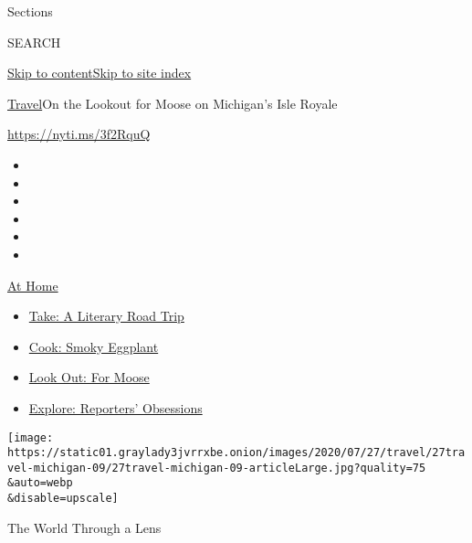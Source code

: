 Sections

SEARCH

\protect\hyperlink{site-content}{Skip to
content}\protect\hyperlink{site-index}{Skip to site index}

\href{/section/travel}{Travel}\textbar{}On the Lookout for Moose on
Michigan's Isle Royale

\url{https://nyti.ms/3f2RquQ}

\begin{itemize}
\item
\item
\item
\item
\item
\item
\end{itemize}

\href{https://www.nytimes3xbfgragh.onion/spotlight/at-home?action=click\&pgtype=Article\&state=default\&region=TOP_BANNER\&context=at_home_menu}{At
Home}

\begin{itemize}
\tightlist
\item
  \href{https://www.nytimes3xbfgragh.onion/2020/07/28/books/time-for-a-literary-road-trip.html?action=click\&pgtype=Article\&state=default\&region=TOP_BANNER\&context=at_home_menu}{Take:
  A Literary Road Trip}
\item
  \href{https://www.nytimes3xbfgragh.onion/2020/07/29/magazine/bored-with-your-home-cooking-some-smoky-eggplant-will-fix-that.html?action=click\&pgtype=Article\&state=default\&region=TOP_BANNER\&context=at_home_menu}{Cook:
  Smoky Eggplant}
\item
  \href{https://www.nytimes3xbfgragh.onion/2020/07/27/travel/moose-michigan-isle-royale.html?action=click\&pgtype=Article\&state=default\&region=TOP_BANNER\&context=at_home_menu}{Look
  Out: For Moose}
\item
  \href{https://www.nytimes3xbfgragh.onion/interactive/2020/at-home/even-more-reporters-editors-diaries-lists-recommendations.html?action=click\&pgtype=Article\&state=default\&region=TOP_BANNER\&context=at_home_menu}{Explore:
  Reporters' Obsessions}
\end{itemize}

\texttt{[image: https://static01.graylady3jvrrxbe.onion/images/2020/07/27/travel/27travel-michigan-09/27travel-michigan-09-articleLarge.jpg?quality=75\\\&auto=webp\\\&disable=upscale]}

The World Through a Lens

